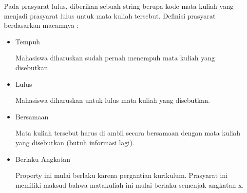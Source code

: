 Pada prasyarat lulus, diberikan sebuah string berupa kode mata kuliah yang menjadi prasyarat lulus untuk mata kuliah tersebut.
Definisi prasyarat berdasarkan macamnya :

\begin{itemize}
    \item Tempuh
    
    Mahasiswa diharuskan sudah pernah menempuh mata kuliah yang disebutkan.
    \item Lulus
    
    Mahasiswa diharuskan untuk lulus mata kuliah yang disebutkan.
    \item Bersamaan
    
    Mata kuliah tersebut harus di ambil secara bersamaan dengan mata kuliah yang disebutkan (butuh informasi lagi).
    \item Berlaku Angkatan
    
    Property ini mulai berlaku karena pergantian kurikulum. Prasyarat ini memiliki maksud bahwa matakuliah ini mulai berlaku semenjak angkatan x.
\end{itemize}




